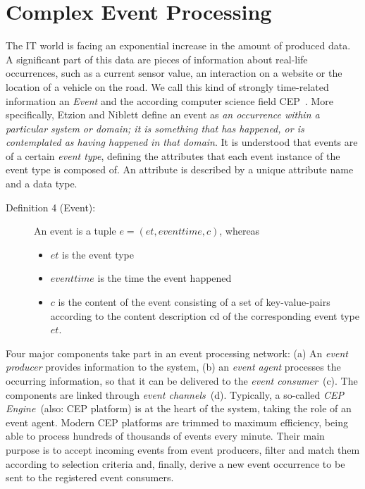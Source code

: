 \section{Complex Event Processing}\label{ch:bg:cep}
The IT world is facing an exponential increase in the amount of produced data. A significant part of this data are pieces of information about real-life occurrences, such as a current sensor value, an interaction on a website or the location of a vehicle on the road.
We call this kind of strongly time-related information an \textit{Event} and the according computer science field \acf{CEP}~\cite{evtprocessing}.
More specifically, Etzion and Niblett define an event as \textit{an occurrence within a particular system or domain; it is something that has happened, or is contemplated as having happened in that domain}.
It is understood that events are of a certain \textit{event type}, defining the attributes that each event instance of the event type is composed of. An attribute is described by a unique attribute name and a data type.

\pagebreak

\begin{description}
	\item[Definition 4 (Event):]
	An event is a tuple $e = (et, eventtime, c)$, whereas
	\begin{itemize} 
		\item
		$et$ is the event type
		\item 
		$eventtime$ is the time the event happened
		\item
		$c$ is the content of the event consisting of a set of key-value-pairs according to the content description cd of the corresponding event type $et$.
	\end{itemize}
\end{description}


Four major components take part in an event processing network: (a) An \textit{event producer} provides information to the system, (b) an \textit{event agent} processes the occurring information, so that it can be delivered to the \textit{event consumer}~(c). The components are linked through \textit{event channels}~(d).
Typically, a so-called \textit{\acs{CEP} Engine}~(also: CEP platform) is at the heart of the system, taking the role of an event agent.
Modern CEP platforms are trimmed to maximum efficiency, being able to process hundreds of thousands of events every minute.
Their main purpose is to accept incoming events from event producers, filter and match them according to selection criteria and, finally, derive a new event occurrence to be sent to the registered event consumers.


